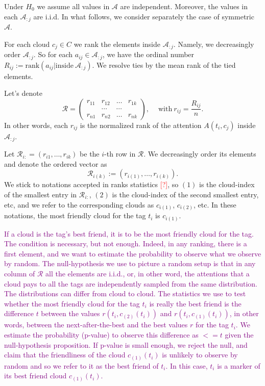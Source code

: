 \documentclass{llncs}
\begin{document}
Under $H_0$ we assume all values in $\mathcal{A}$ are independent. Moreover, the values in each
$\mathcal{A}_{:j}$ are i.i.d.
In what follows, we consider separately the case of symmetric $\mathcal{A}$.

For each cloud $c_j \in C$ we rank the elements inside
$\mathcal{A}_{:j}$.
Namely, we decreasingly order $\mathcal{A}_{:j}$. So for each $a_{ij} \in \mathcal{A}_{:j}$, we have the ordinal number $R_{ij}:=\text{rank}\left(a_{ij}|\text{inside}~\mathcal{A}_{:j}\right)$. We resolve ties by the mean rank of the tied elements. 

Let's denote
\[
\mathcal{R} = \begin{pmatrix}
r_{11} & r_{12} & \dots & r_{1k} \\
       &\cdots & \cdots &  \\
r_{n1} & r_{n2} & \dots & r_{nk}
\end{pmatrix}, 
\quad ~\text{with}~r_{ij} = \frac{R_{ij}}{n}.
\]
In other words, each $r_{ij}$ is the normalized rank of the attention $A(t_i, c_j)$ inside $\mathcal{A}_{:j}$. 

Let $\mathcal{R}_{i:} = (r_{i1}, \dots, r_{ik})$ be the $i$-th row in $\mathcal{R}$. We decreasingly order its elements and denote the ordered vector as
\[
\mathcal{R}_{i(k)} := (r_{i(1)}, \dots, r_{i(k)}).
\]
We stick to notations accepted in ranks statistics \textcolor{red}{[?]}, so $(1)$ is the cloud-index of the smallest entry in $\mathcal{R}_{i:}$, ${(2)}$ is the cloud-index of the second smallest entry, etc, and we refer to the corresponding clouds as $c_{i(1)}$, $c_{i(2)}$, etc. 
In these notations, the most friendly cloud for the tag $t_i$ is $c_{i(1)}$.
 
\textcolor{purple}{If a cloud is the tag's best friend, it is to be the most friendly cloud for the tag. The condition is necessary, but not enough. Indeed, in any ranking, there is a first element, and we want to estimate the probability to observe what we observe by random. 
The null-hypothesis we use to picture a random setup is that in any column of $\mathcal{R}$ all the elements are i.i.d., or, in other word, the attentions that a cloud pays to all the tags are independently sampled from the same distribution. The distributions can differ from cloud to cloud. 
The statistics we use to test whether the most friendly cloud for the tag $t_i$ is really the best friend is the difference $t$ between the values $r(t_i,c_{(2)}(t_i))$ and $r(t_i,c_{(1)}(t_i))$, in other words, between the next-after-the-best and the best values $r$ for the tag $t_i$. We estimate the probability (p-value) to observe this difference as $<=t$ given the null-hypothesis proposition. If p-value is small enough, we reject the null, and claim that the friendliness of the cloud $c_{(1)}(t_i)$ is unlikely to observe by random and so we refer to it as the best friend of $t_i$. In this case, $t_i$ is a marker of its best friend cloud $c_{(1)}(t_i)$.
}
\end{document}
